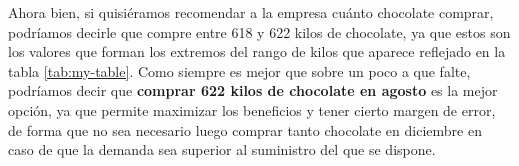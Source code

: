 \documentclass[11pt,a4paper]{article}
\begin{document}
Ahora bien, si quisiéramos recomendar a la empresa cuánto chocolate comprar, podríamos decirle que compre
entre 618 y 622 kilos de chocolate, ya que estos son los valores que forman los extremos del rango de kilos
que aparece reflejado en la tabla \ref{tab:my-table}. Como siempre es mejor que sobre un poco a que falte, podríamos decir
que \textbf{comprar 622 kilos de chocolate en agosto} es la mejor opción, ya que permite maximizar
los beneficios y tener cierto margen de error, de forma que no sea necesario luego comprar tanto chocolate
en diciembre en caso de que la demanda sea superior al suministro del que se dispone.
\end{document}
